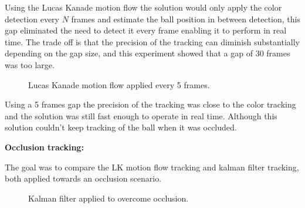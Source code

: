 \documentclass[10pt,twocolumn,letterpaper]{article}
\begin{document}
  Using the Lucas Kanade motion flow the solution would only apply the color
  detection every $N$ frames and estimate the ball position in between
  detection, this gap eliminated the need to detect it every frame enabling it
  to perform in real time. The trade off is that the precision of the tracking
  can diminish substantially depending on the gap size, and this experiment
  showed that a gap of 30 frames was too large.

  \begin{figure}[!h]
    \centering
    \setlength{\fboxsep}{1pt}
    \setlength{\fboxrule}{1pt}
    \caption{Lucas Kanade motion flow applied every 5 frames.}\label{fig:motion_5}
  \end{figure}

  Using a 5 frames gap the precision of the tracking was close to the color
  tracking and the solution was still fast enough to operate in real time.
  Although this solution couldn't keep tracking of the ball when it was occluded.

  \bigbreak{}
  \textbf{Occlusion tracking:}
  \bigbreak{}

  The goal was to compare the LK motion flow tracking and kalman filter
  tracking, both applied towards an occlusion scenario.

  \begin{figure}[!h]
    \centering
    \setlength{\fboxsep}{1pt}
    \setlength{\fboxrule}{1pt}
    \caption{Kalman filter applied to overcome occlusion.}\label{fig:occlusion}
  \end{figure}
\end{document}
